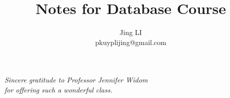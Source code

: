 
\def\PREAMBLE{PREAMBLE}
\title{Notes for Database Course}
\author{Jing LI\\pkuyplijing@gmail.com}

\pagestyle{empty}
\hypersetup{pageanchor=false}
\maketitle
\begin{center}
\emph{Sincere gratitude to Professor Jennifer Widom\\for offering such a wonderful class.}
\end{center}
\tableofcontents
\newpage
\hypersetup{pageanchor=true}
\pagestyle{headings}






